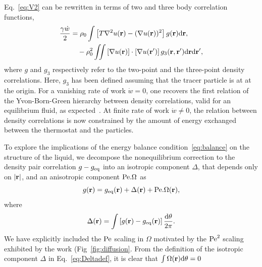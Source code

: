 \documentclass[pre, superscriptaddress, twocolumn,pre]{revtex4-1}
\newcommand{\dd}{\text{d}}
\begin{document}
Eq.~\ref{eq:V2} can be rewritten in terms of two and three body correlation functions, 
\begin{equation}\label{eq:balance}
	\begin{aligned}
		\frac{\gamma \dot w}{2} &= \rho_0 \int \left[T \nabla^2 u({\bf r}) - (\nabla u({\bf r}))^2\right] g({\bf r}) \dd{\bf r} ,
		\\
		&\quad - \rho_0^2 \iint \left[\nabla u({\bf r})\right] \cdot \left[\nabla u({\bf r}')\right] g_3({\bf r}, {\bf r}') \dd{\bf r} \dd{\bf r}' ,
	\end{aligned}
\end{equation}
where $g$ and $g_3$ respectively refer to the two-point and the three-point density correlations. Here, $g_3$ has been defined assuming that the tracer particle is at at the origin. For a vanishing rate of work $\dot w = 0$, one recovers the first relation of the Yvon-Born-Green hierarchy between density correlations, valid for an equilibrium fluid, as expected~\cite{Hansen2013}. At finite rate of work $\dot w\neq0$, the relation between density correlations is now constrained by the amount of energy exchanged between the thermostat and the particles.


To explore the implications of the energy balance condition~\eqref{eq:balance} on the structure of the liquid, we decompose the nonequilibrium correction to the density pair correlation $g-g_{\rm eq}$ into an isotropic component $\Delta$, that depends only on $|{\bf r}|$, and an anisotropic component ${\rm Pe}.\Omega$ as
\begin{equation}\label{eq:g_dec}
	g({\bf r}) = g_{\rm eq}({\bf r}) + \Delta({\bf r}) + {\rm Pe}.\Omega({\bf r}) ,
\end{equation}
where
\begin{equation}\label{eq:Deltadef}
	\Delta({\bf r}) = \int \left[g({\bf r}) - g_{\rm eq}({\bf r}) \right] \frac{\dd\theta}{2\pi} .
\end{equation} 
We have explicitly included the $\rm Pe$ scaling in $\Omega$ motivated by the ${\rm Pe}^2$ scaling exhibited by the work (Fig~\ref{fig:diffusion}.  From the definition of the isotropic component $\Delta$ in Eq.~\ref{eq:Deltadef}, it is clear that $\int\Omega({\bf r}){\dd\theta}=0$ 
\end{document}
